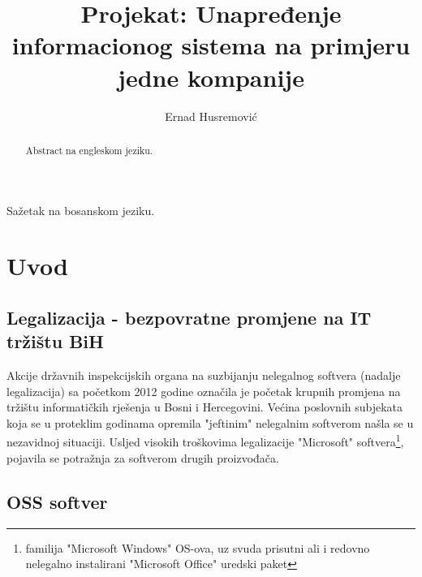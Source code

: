 \documentclass[times, utf8, seminar]{fit}
\begin{document}
\title{Projekat: Unapređenje informacionog sistema na primjeru jedne kompanije}

\author{Ernad Husremović}


\maketitle

\tableofcontents

\listoftables
\listoffigures

\begin{sazetak}


Sažetak na bosanskom jeziku.

\end{sazetak}

\begin{abstract}
Abstract na engleskom jeziku.

\end{abstract}


\chapter{Uvod}

\section{Legalizacija - bezpovratne promjene na IT tržištu BiH}

Akcije državnih inspekcijskih organa na suzbijanju nelegalnog softvera (nadalje legalizacija) sa početkom 2012 godine označila je početak krupnih promjena na tržištu informatičkih  rješenja u Bosni i Hercegovini. 
Većina poslovnih subjekata koja se u proteklim godinama opremila "jeftinim" nelegalnim softverom  našla se u nezavidnoj situaciji.
Usljed visokih troškovima legalizacije "Microsoft" softvera\footnote{familija "Microsoft Windows" OS-ova, uz svuda prisutni ali i redovno nelegalno instalirani "Microsoft Office" uredski paket}, pojavila se potražnja za softverom drugih proizvođača.  

\section{OSS softver}
\end{document}
